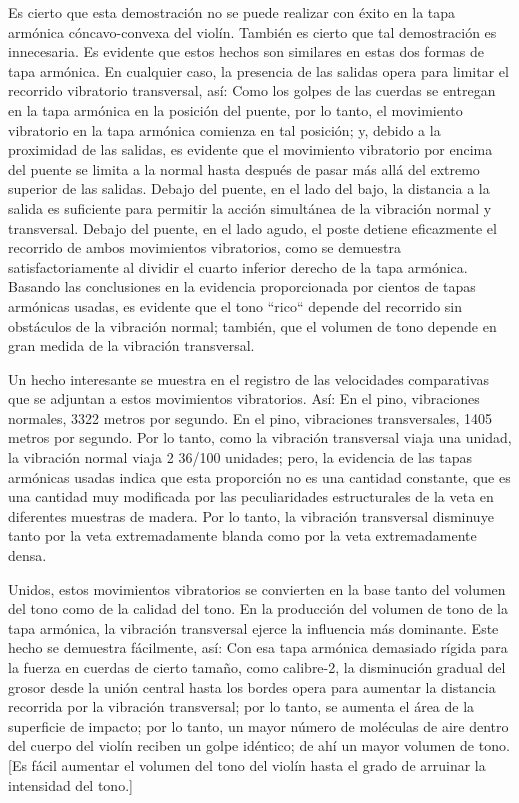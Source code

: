 \documentclass[12pt]{book}
\begin{document}
Es cierto que esta demostración no se puede realizar con éxito en la tapa armónica cóncavo-convexa del violín. También es cierto que tal demostración es innecesaria. Es evidente que estos hechos son similares en estas dos formas de tapa armónica. En cualquier caso, la presencia de las salidas opera para limitar el recorrido vibratorio transversal, así: Como los golpes de las cuerdas se entregan en la tapa armónica en la posición del puente, por lo tanto, el movimiento vibratorio en la tapa armónica comienza en tal posición; y, debido a la proximidad de las salidas, es evidente que el movimiento vibratorio por encima del puente se limita a la normal hasta después de pasar más allá del extremo superior de las salidas. Debajo del puente, en el lado del bajo, la distancia a la salida es suficiente para permitir la acción simultánea de la vibración normal y transversal. Debajo del puente, en el lado agudo, el poste detiene eficazmente el recorrido de ambos movimientos vibratorios, como se demuestra satisfactoriamente al dividir el cuarto inferior derecho de la tapa armónica. Basando las conclusiones en la evidencia proporcionada por cientos de tapas armónicas usadas, es evidente que el tono ``rico`` depende del recorrido sin obstáculos de la vibración normal; también, que el volumen de tono depende en gran medida de la vibración transversal.

Un hecho interesante se muestra en el registro de las velocidades comparativas que se adjuntan a estos movimientos vibratorios. Así: En el pino, vibraciones normales, 3322 metros por segundo. En el pino, vibraciones transversales, 1405 metros por segundo. Por lo tanto, como la vibración transversal viaja una unidad, la vibración normal viaja 2 36/100 unidades; pero, la evidencia de las tapas armónicas usadas indica que esta proporción no es una cantidad constante, que es una cantidad muy modificada por las peculiaridades estructurales de la veta en diferentes muestras de madera. Por lo tanto, la vibración transversal disminuye tanto por la veta extremadamente blanda como por la veta extremadamente densa.

Unidos, estos movimientos vibratorios se convierten en la base tanto del volumen del tono como de la calidad del tono. En la producción del volumen de tono de la tapa armónica, la vibración transversal ejerce la influencia más dominante. Este hecho se demuestra fácilmente, así: Con esa tapa armónica demasiado rígida para la fuerza en cuerdas de cierto tamaño, como calibre-2, la disminución gradual del grosor desde la unión central hasta los bordes opera para aumentar la distancia recorrida por la vibración transversal; por lo tanto, se aumenta el área de la superficie de impacto; por lo tanto, un mayor número de moléculas de aire dentro del cuerpo del violín reciben un golpe idéntico; de ahí un mayor volumen de tono. [Es fácil aumentar el volumen del tono del violín hasta el grado de arruinar la intensidad del tono.]
\end{document}
